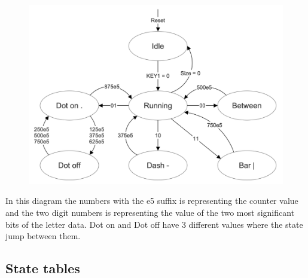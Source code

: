 \documentclass{article}
\begin{document}
\clearpage

\begin{figure}[h]
    \centering
    \includegraphics[width=1\textwidth]{Figures/StateTransitionDiagram.png}
    \label{fig:StateTransition}
\end{figure}
In this diagram the numbers with the e5 suffix is representing the counter value and the two digit numbers is representing the value of the two most significant bits of the letter data. Dot on and Dot off have 3 different values where the state jump between them.

\clearpage
 \subsection{State tables}
 
\end{document}

